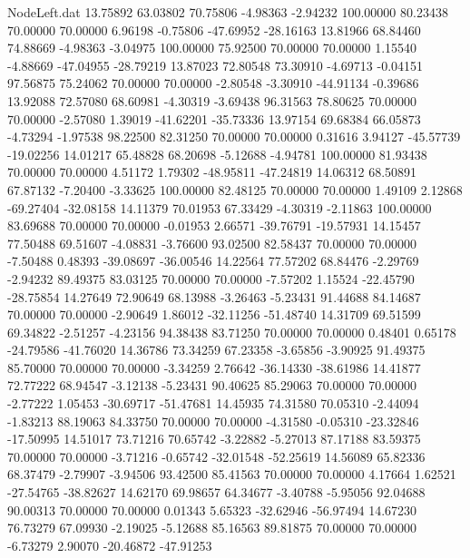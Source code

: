 \begin{filecontents}{NodeLeft.dat}
  13.75892   63.03802   70.75806    -4.98363   -2.94232  100.00000   80.23438   70.00000   70.00000    6.96198   -0.75806  -47.69952  -28.16163
  13.81966   68.84460   74.88669    -4.98363   -3.04975  100.00000   75.92500   70.00000   70.00000    1.15540   -4.88669  -47.04955  -28.79219
  13.87023   72.80548   73.30910    -4.69713   -0.04151   97.56875   75.24062   70.00000   70.00000   -2.80548   -3.30910  -44.91134   -0.39686
  13.92088   72.57080   68.60981    -4.30319   -3.69438   96.31563   78.80625   70.00000   70.00000   -2.57080    1.39019  -41.62201  -35.73336
  13.97154   69.68384   66.05873    -4.73294   -1.97538   98.22500   82.31250   70.00000   70.00000    0.31616    3.94127  -45.57739  -19.02256
  14.01217   65.48828   68.20698    -5.12688   -4.94781  100.00000   81.93438   70.00000   70.00000    4.51172    1.79302  -48.95811  -47.24819
  14.06312   68.50891   67.87132    -7.20400   -3.33625  100.00000   82.48125   70.00000   70.00000    1.49109    2.12868  -69.27404  -32.08158
  14.11379   70.01953   67.33429    -4.30319   -2.11863  100.00000   83.69688   70.00000   70.00000   -0.01953    2.66571  -39.76791  -19.57931
  14.15457   77.50488   69.51607    -4.08831   -3.76600   93.02500   82.58437   70.00000   70.00000   -7.50488    0.48393  -39.08697  -36.00546
  14.22564   77.57202   68.84476    -2.29769   -2.94232   89.49375   83.03125   70.00000   70.00000   -7.57202    1.15524  -22.45790  -28.75854
  14.27649   72.90649   68.13988    -3.26463   -5.23431   91.44688   84.14687   70.00000   70.00000   -2.90649    1.86012  -32.11256  -51.48740
  14.31709   69.51599   69.34822    -2.51257   -4.23156   94.38438   83.71250   70.00000   70.00000    0.48401    0.65178  -24.79586  -41.76020
  14.36786   73.34259   67.23358    -3.65856   -3.90925   91.49375   85.70000   70.00000   70.00000   -3.34259    2.76642  -36.14330  -38.61986
  14.41877   72.77222   68.94547    -3.12138   -5.23431   90.40625   85.29063   70.00000   70.00000   -2.77222    1.05453  -30.69717  -51.47681
  14.45935   74.31580   70.05310    -2.44094   -1.83213   88.19063   84.33750   70.00000   70.00000   -4.31580   -0.05310  -23.32846  -17.50995
  14.51017   73.71216   70.65742    -3.22882   -5.27013   87.17188   83.59375   70.00000   70.00000   -3.71216   -0.65742  -32.01548  -52.25619
  14.56089   65.82336   68.37479    -2.79907   -3.94506   93.42500   85.41563   70.00000   70.00000    4.17664    1.62521  -27.54765  -38.82627
  14.62170   69.98657   64.34677    -3.40788   -5.95056   92.04688   90.00313   70.00000   70.00000    0.01343    5.65323  -32.62946  -56.97494
  14.67230   76.73279   67.09930    -2.19025   -5.12688   85.16563   89.81875   70.00000   70.00000   -6.73279    2.90070  -20.46872  -47.91253

\end{filecontents}
